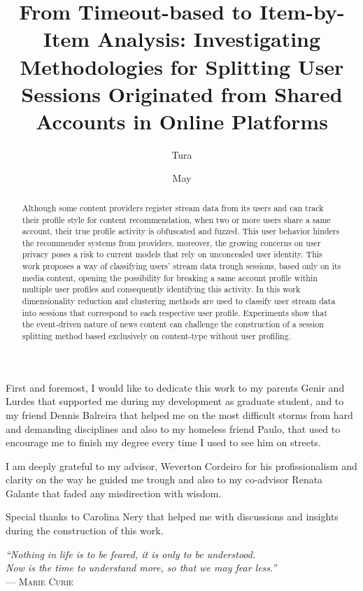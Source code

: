 \documentclass[ecp,tc,english]{iiufrgs}
\title{From Timeout-based to Item-by-Item Analysis: Investigating Methodologies for Splitting User Sessions Originated from Shared Accounts in Online Platforms}
\author{Tura}{Matheus Toazza}
\date{May}{2021}
\begin{document}
\maketitle

\begin{acknowledgements}
First and foremost, I would like to dedicate this work to my parents Genir and Lurdes that supported me during my development as graduate student, and to my friend Dennis Balreira that helped me on the most difficult storms from hard and demanding disciplines and also to my homeless friend Paulo, that used to encourage me to finish my degree every time I used to see him on streets.

I am deeply grateful to my advisor, Weverton Cordeiro for his profissionalism and clarity on the way he guided me trough and also to my co-advisor Renata Galante that faded any misdirection with wisdom.

Special thanks to Carolina Nery that helped me with discussions and insights during the construction of this work.
\end{acknowledgements}

\clearpage
\begin{flushright}
    \mbox{}
    \vfill
    {\sffamily\itshape
      ``Nothing in life is to be feared, it is only to be understood.\\
      Now is the time to understand more, so that we may fear less.''\\}
    --- \textsc{Marie Curie}
\end{flushright}

\begin{abstract}
  Although some content providers register stream data from its users and can track their profile style for content recommendation, when two or more users share a same account, their true profile activity is obfuscated and fuzzed. This user behavior hinders the recommender systems from providers, moreover, the growing concerns on user privacy poses a risk to current models that rely on unconcealed user identity. This work proposes a way of classifying users' stream data trough sessions, based only on its media content, opening the possibility for breaking a same account profile within multiple user profiles and consequently identifying this activity. In this work dimensionality reduction and clustering methods are used to classify user stream data into sessions that correspond to each respective user profile.
  Experiments show that the event-driven nature of news content can challenge the construction of a session splitting method based exclusively on content-type without user profiling.
\end{abstract}
\end{document}
